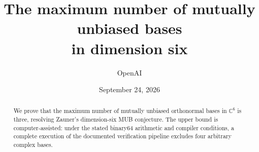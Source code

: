 \documentclass[11pt]{article}
\title{The maximum number of mutually unbiased bases\\in dimension six}
\author{OpenAI}
\date{September 24, 2026}
\newcommand{\C}{\mathbb C}
\theoremstyle{definition}
\theoremstyle{remark}
\numberwithin{equation}{section}
\begin{document}
\maketitle
\begin{abstract}
We prove that the maximum number of mutually unbiased orthonormal bases
in $\C^6$ is three, resolving Zauner's dimension-six MUB conjecture.
The upper bound is computer-assisted: under the stated binary64 arithmetic
and compiler conditions, a complete execution of the documented verification
pipeline excludes four arbitrary complex bases.
\end{abstract}

\tableofcontents










\appendix




\end{document}
